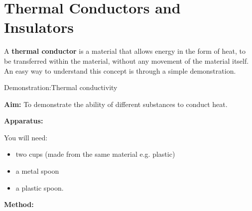             \section{Thermal Conductors and Insulators}
            \nopagebreak
      \label{m38706*id66527}A \textbf{thermal conductor} is a material that allows energy in the form of heat, to be transferred within the material, without any movement of the material itself. An easy way to understand this concept is through a simple demonstration.\par 
\label{m38706*secfhsst!!!underscore!!!id453}
            \begin{g_experiment}{Demonstration:Thermal conductivity}{
            \nopagebreak
            \label{m38706*id66568}\noindent{}\textbf{Aim: }\newline
    To demonstrate the ability of different substances to conduct heat.\par 
      \label{m38706*id66588}\noindent{}\textbf{Apparatus: }\newline
\begin{minipage}{.5\textwidth}
You will need:
\begin{itemize}
 \item two cups (made from the same material e.g. plastic)
\item a metal spoon
\item a plastic spoon.
\end{itemize} 
\end{minipage}
\begin{minipage}{.5\textwidth}
	\begin{figure}[H] %
    \begin{center}
    \end{center}
 \end{figure} 
\end{minipage}
      \label{m38706*id66592}\textbf{Method:}
}
\end{g_experiment}
